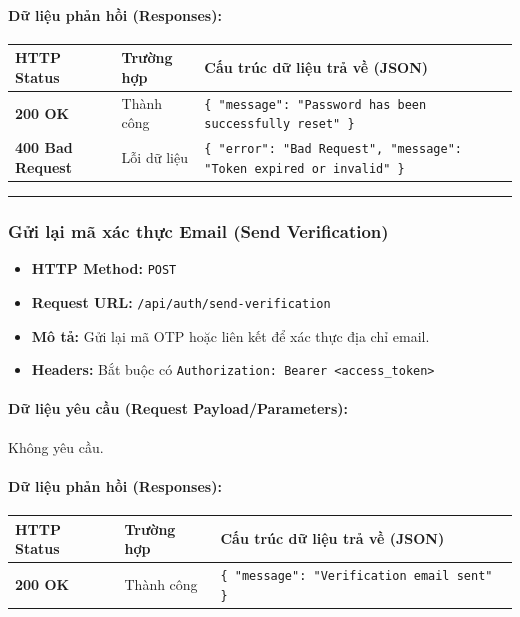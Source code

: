 \documentclass[12pt,a4paper]{article}
\begin{document}
\paragraph{Dữ liệu phản hồi (Responses):}
\begin{longtable}{|>{\raggedright\arraybackslash}p{2.8cm}|>{\raggedright\arraybackslash}p{3.2cm}|>{\raggedright\arraybackslash}p{8.0cm}|}
\hline
\textbf{HTTP Status} & \textbf{Trường hợp} & \textbf{Cấu trúc dữ liệu trả về (JSON)} \\ \hline
\endhead
\textbf{200 OK} & Thành công & \texttt{\{ "message": "Password has been successfully reset" \}} \\ \hline
\textbf{400 Bad Request} & Lỗi dữ liệu & \texttt{\{ "error": "Bad Request", "message": "Token expired or invalid" \}} \\ \hline
\end{longtable}

\vskip 0.4cm
\noindent\rule{\textwidth}{0.3pt}
\vskip 0.4cm

\subsubsection{Gửi lại mã xác thực Email (Send Verification)}
\begin{itemize}[leftmargin=*]
    \item \textbf{HTTP Method:} \texttt{POST}
    \item \textbf{Request URL:} \texttt{/api/auth/send-verification}
    \item \textbf{Mô tả:} Gửi lại mã OTP hoặc liên kết để xác thực địa chỉ email.
    \item \textbf{Headers:} Bắt buộc có \texttt{Authorization: Bearer \textless{}access\_token\textgreater{}}
\end{itemize}

\paragraph{Dữ liệu yêu cầu (Request Payload/Parameters):}
Không yêu cầu.\\

\paragraph{Dữ liệu phản hồi (Responses):}
\begin{longtable}{|>{\raggedright\arraybackslash}p{2.8cm}|>{\raggedright\arraybackslash}p{3.2cm}|>{\raggedright\arraybackslash}p{8.0cm}|}
\hline
\textbf{HTTP Status} & \textbf{Trường hợp} & \textbf{Cấu trúc dữ liệu trả về (JSON)} \\ \hline
\endhead
\textbf{200 OK} & Thành công & \texttt{\{ "message": "Verification email sent" \}} \\ \hline
\end{longtable}
\end{document}
